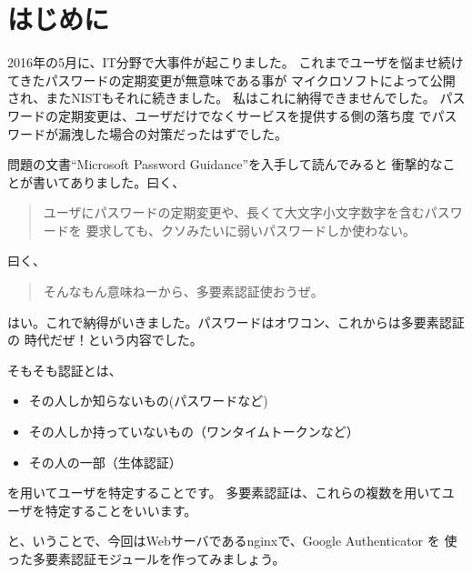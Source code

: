 \chapter*{はじめに}

2016年の5月に、IT分野で大事件が起こりました。
これまでユーザを悩ませ続けてきたパスワードの定期変更が無意味である事が
マイクロソフトによって公開され、またNISTもそれに続きました。
私はこれに納得できませんでした。
パスワードの定期変更は、ユーザだけでなくサービスを提供する側の落ち度
でパスワードが漏洩した場合の対策だったはずでした。

問題の文書``Microsoft Password Guidance''を入手して読んでみると
衝撃的なことが書いてありました。曰く、
\begin{quote}
ユーザにパスワードの定期変更や、長くて大文字小文字数字を含むパスワードを
要求しても、クソみたいに弱いパスワードしか使わない。
\end{quote}
曰く、
\begin{quote}
そんなもん意味ねーから、多要素認証使おうぜ。
\end{quote}

はい。これで納得がいきました。パスワードはオワコン、これからは多要素認証の
時代だぜ！という内容でした。

そもそも認証とは、
\begin{itemize}
	\item その人しか知らないもの(パスワードなど)
	\item その人しか持っていないもの（ワンタイムトークンなど）
	\item その人の一部（生体認証）
\end{itemize}
を用いてユーザを特定することです。
多要素認証は、これらの複数を用いてユーザを特定することをいいます。

と、いうことで、今回はWebサーバであるnginxで、Google Authenticator を
使った多要素認証モジュールを作ってみましょう。
